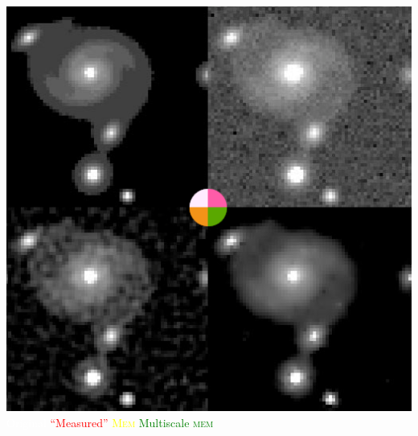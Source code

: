 \documentclass[14pt,c]{beamer}
\begin{document}
\begin{frame}
  \centering
  \includegraphics[width=0.625\framewidth]{astro-maxent}
  \\
  \textcolor{white}{Original}\;
  \textcolor{red}{``Measured''}\;
  \textcolor{yellow}{\textsc{Mem}}\;
  \textcolor{green}{Multiscale \textsc{mem}}

  \scriptsize
  \vspace{\baselineskip}
\end{frame}
\end{document}
